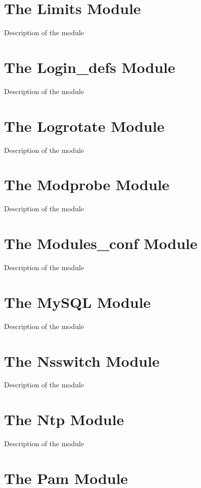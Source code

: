 \section{The Limits Module}

Description of the module

\section{The Login\_defs Module}

Description of the module

\section{The Logrotate Module}

Description of the module

\section{The Modprobe Module}

Description of the module

\section{The Modules\_conf Module}

Description of the module

\section{The MySQL Module}

Description of the module

\section{The Nsswitch Module}

Description of the module

\section{The Ntp Module}

Description of the module

\section{The Pam Module}

